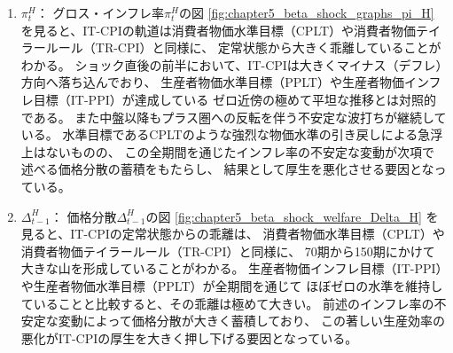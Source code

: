 \begin{enumerate}
    \item
    \label{itm:chapter5_beta_shock_policies_it_cpi_pi_H}
        \(\pi_t^H\)：
        グロス・インフレ率\(\pi_t^H\)の図
        \ref{fig:chapter5_beta_shock_graphs_pi_H}
        を見ると、IT-CPIの軌道は消費者物価水準目標（CPLT）や消費者物価テイラールール（TR-CPI）と同様に、
        定常状態から大きく乖離していることがわかる。
        ショック直後の前半において、IT-CPIは大きくマイナス（デフレ）方向へ落ち込んでおり、
        生産者物価水準目標（PPLT）や生産者物価インフレ目標（IT-PPI）が達成している
        ゼロ近傍の極めて平坦な推移とは対照的である。
        また中盤以降もプラス圏への反転を伴う不安定な波打ちが継続している。
        水準目標であるCPLTのような強烈な物価水準の引き戻しによる急浮上はないものの、
        この全期間を通じたインフレ率の不安定な変動が次項で述べる価格分散の蓄積をもたらし、
        結果として厚生を悪化させる要因となっている。
    \item
    \label{itm:chapter5_beta_shock_policies_it_cpi_Delta_t_minus_1_H}
        \(\Delta_{t-1}^H\)：
        価格分散\(\Delta_{t-1}^H\)の図
        \ref{fig:chapter5_beta_shock_welfare_Delta_H}
        を見ると、IT-CPIの定常状態からの乖離は、
        消費者物価水準目標（CPLT）や消費者物価テイラールール（TR-CPI）と同様に、
        70期から150期にかけて大きな山を形成していることがわかる。
        生産者物価インフレ目標（IT-PPI）や生産者物価水準目標（PPLT）が全期間を通じて
        ほぼゼロの水準を維持していることと比較すると、その乖離は極めて大きい。
        前述のインフレ率の不安定な変動によって価格分散が大きく蓄積しており、
        この著しい生産効率の悪化がIT-CPIの厚生を大きく押し下げる要因となっている。
\end{enumerate}
